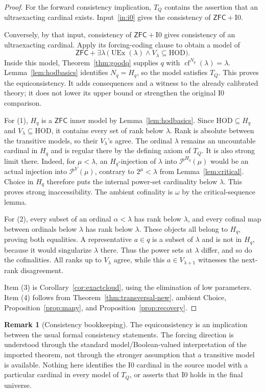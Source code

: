 \documentclass[11pt,letterpaper]{article}
\theoremstyle{definition}
\newtheorem{remark}[definition]{Remark}
\numberwithin{equation}{section}
\newcommand{\ZFC}{\mathsf{ZFC}}
\newcommand{\HOD}{\mathrm{HOD}}
\newcommand{\UEx}{\operatorname{UEx}}
\newcommand{\cf}{\operatorname{cf}}
\newcommand{\Pow}{\mathcal P}
\newcommand{\Izero}{\mathrm{I0}}
\begin{document}
\begin{proof}
For the forward consistency implication, $T_Q$ contains the assertion that an ultraexacting cardinal exists. Input~\ref{in:i0} gives the consistency of $\ZFC+\Izero$.

Conversely, by that input, consistency of $\ZFC+\Izero$ gives consistency of an ultraexacting cardinal. Apply its forcing-coding clause to obtain a model of
\[
\ZFC+\exists\lambda\,
\bigl(\UEx(\lambda)\wedge V_\lambda\subseteq\HOD\bigr).
\]
Inside this model, Theorem~\ref{thm:goodq} supplies $q$ with $\cf^{N_q}(\lambda)=\lambda$. Lemma~\ref{lem:hodbasics} identifies $N_q=H_q$, so the model satisfies $T_Q$. This proves the equiconsistency. It adds consequences and a witness to the already calibrated theory; it does not lower its upper bound or strengthen the original $\Izero$ comparison.

For (1), $H_q$ is a $\ZFC$ inner model by Lemma~\ref{lem:hodbasics}. Since $\HOD\subseteq H_q$ and $V_\lambda\subseteq\HOD$, it contains every set of rank below $\lambda$. Rank is absolute between the transitive models, so their $V_\lambda$'s agree. The ordinal $\lambda$ remains an uncountable cardinal in $H_q$ and is regular there by the defining axiom of $T_Q$. It is also strong limit there. Indeed, for $\mu<\lambda$, an $H_q$-injection of $\lambda$ into $\Pow^{H_q}(\mu)$ would be an actual injection into $\Pow^V(\mu)$, contrary to $2^\mu<\lambda$ from Lemma~\ref{lem:critical}. Choice in $H_q$ therefore puts the internal power-set cardinality below $\lambda$. This proves strong inaccessibility. The ambient cofinality is $\omega$ by the critical-sequence lemma.

For (2), every subset of an ordinal $\alpha<\lambda$ has rank below $\lambda$, and every cofinal map between ordinals below $\lambda$ has rank below $\lambda$. These objects all belong to $H_q$, proving both equalities. A representative $a\in q$ is a subset of $\lambda$ and is not in $H_q$, because it would singularize $\lambda$ there. Thus the power sets at $\lambda$ differ, and so do the cofinalities. All ranks up to $V_\lambda$ agree, while this $a\in V_{\lambda+1}$ witnesses the next-rank disagreement.

Item (3) is Corollary~\ref{cor:exactcloud}, using the elimination of low parameters. Item (4) follows from Theorem~\ref{thm:transversal-new}, ambient Choice, Proposition~\ref{prop:many}, and Proposition~\ref{prop:recovery}.
\end{proof}

\begin{remark}[Consistency bookkeeping]
The equiconsistency is an implication between the usual formal consistency statements. The forcing direction is understood through the standard model/Boolean-valued interpretation of the imported theorem, not through the stronger assumption that a transitive model is available. Nothing here identifies the $\Izero$ cardinal in the source model with a particular cardinal in every model of $T_Q$, or asserts that $\Izero$ holds in the final universe.
\end{remark}
\end{document}
